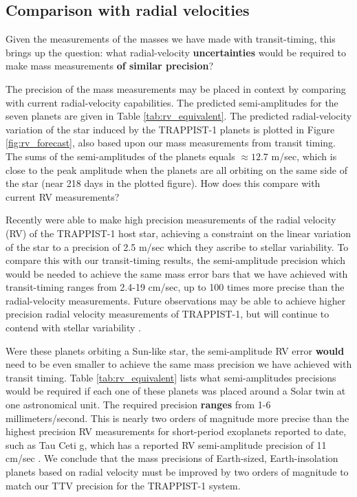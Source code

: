 \documentclass[twocolumn]{aastex63}
\begin{document}
\subsection{Comparison with radial velocities}

Given the measurements of the masses we have made with transit-timing,
this brings up the question:  what radial-velocity \textbf{uncertainties} would be
required to make mass measurements \textbf{of similar precision}?

The precision of the mass measurements may be placed in
context by comparing with current radial-velocity capabilities.
The predicted semi-amplitudes for the seven planets are given
in Table \ref{tab:rv_equivalent}.
The predicted radial-velocity variation of the star induced by the TRAPPIST-1
planets is plotted in Figure \ref{fig:rv_forecast}, also based upon our
mass measurements from transit timing.  The sums of the semi-amplitudes
of the planets equals ${\approx}12.7$ m/sec, which is close to the
peak amplitude when the planets are all orbiting on the same side of
the star (near 218 days in the plotted figure).  How does this compare
with current RV measurements?

Recently \citet{Hirano2020} were able to make high precision
measurements of the radial velocity (RV) of the TRAPPIST-1 host star,
achieving a constraint on the linear variation of the star to
a precision of 2.5 m/sec which they ascribe
to stellar variability.  To compare this with our
transit-timing results, the semi-amplitude precision
which would be needed to achieve the same mass error bars that
we have achieved with transit-timing ranges from 2.4-19 cm/sec,
up to 100 times more precise than the radial-velocity measurements.
Future observations may be able to achieve higher precision radial
velocity measurements of TRAPPIST-1, but will continue to contend with stellar
variability \citep{Klein2019}.

Were these planets orbiting a Sun-like star, the semi-amplitude RV error \textbf{would}
need to be even smaller to achieve
the same mass precision we have achieved with transit timing.
Table \ref{tab:rv_equivalent} lists what semi-amplitudes precisions
would be required if each one of these planets was placed around a
Solar twin at one astronomical unit.  The required precision \textbf{ranges}
from 1-6 millimeters/second.  This is nearly two orders of magnitude
more precise than the highest precision RV measurements
for short-period exoplanets reported to date, such as Tau Ceti g,
which has a reported RV semi-amplitude precision of 11 cm/sec \citep{Feng2017}.
We conclude that the mass precisions of Earth-sized, Earth-insolation
planets based on radial velocity must be improved by two orders
of magnitude to match our TTV precision for the TRAPPIST-1 system.
\end{document}
